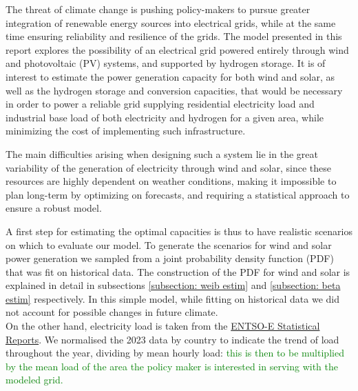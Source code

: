 \documentclass[english]{article}
\numberwithin{definition}{section}
\numberwithin{theorem}{section}
\numberwithin{problem}{section}
\begin{document}
The threat of climate change is pushing policy-makers to pursue greater integration of renewable energy sources into electrical grids, while at the same time ensuring reliability and resilience of the grids. The model presented in this report explores the possibility of an electrical grid powered entirely through wind and photovoltaic (PV) systems, and supported by hydrogen storage.
It is of interest to estimate the power generation capacity for both wind and solar, as well as the hydrogen storage and conversion capacities, that would be necessary in order to power a reliable grid supplying residential electricity load and industrial base load of both electricity and hydrogen for a given area, while minimizing the cost of implementing such infrastructure. 

The main difficulties arising when designing such a system lie in the great variability of the generation of electricity through wind and solar, since these resources are highly dependent on weather conditions, making it impossible to plan long-term by optimizing on forecasts, and requiring a statistical approach to ensure a robust model.

A first step for estimating the optimal capacities is thus to have realistic scenarios on which to evaluate our model.
To generate the scenarios for wind and solar power generation we sampled from a joint probability density function (PDF) that was fit on historical data. The construction of the PDF for wind and solar is explained in detail in subsections \ref{subsection: weib estim} and \ref{subsection: beta estim} respectively. 
 In this simple model, while fitting on historical data we did not account for possible changes in future climate.\\
On the other hand, electricity load is taken from the \textcolor{yellow}{\href{https://www.entsoe.eu/data/power-stats/}{ENTSO-E Statistical Reports}}. We normalised the 2023 data by country to indicate the trend of load throughout the year, dividing by mean hourly load: \textcolor{green}{this is then to be multiplied by the mean load of the area the policy maker is interested in serving with the modeled grid.}
\end{document}
